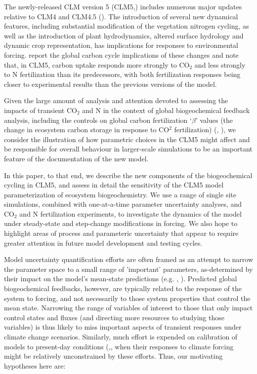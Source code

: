 \documentclass[draft,linenumbers]{agujournal}
\begin{document}
The newly-released CLM version 5  (CLM5,\cite{lawrence2018}) includes numerous major updates relative to CLM4 and CLM4.5 (\cite{lawrence2011}). The introduction of several new dynamical features, including substantial modification of the vegetation nitrogen cycling, as well as the introduction of plant hydrodynamics, altered surface hydrology and dynamic crop representation, has implications for responses to environmental forcing. \cite{wieder2019} report the global carbon cycle implications of these changes and note that, in CLM5, carbon uptake responds more strongly to CO$_{2}$ and less strongly to N fertilization than its predecessors, with both fertilization responses being closer to experimental results than the previous versions of the model. 

Given the large amount of analysis and attention devoted to assessing the impacts of transient CO$_{2}$ and N in the context of global biogeochemical feedback analysis, including the controls on global carbon fertilization `$\beta$' values (the change in ecosystem carbon storage in response to CO$^{2}$ fertilization) (\cite{arora2013}, \cite{friedlingstein2014}), we consider the illustration of how parametric choices in the CLM5 might affect and be responsible for overall behaviour in larger-scale simulations to be an important feature of the documentation of the new model.

In this paper, to that end, we describe the new components of the biogeochemical cycling in CLM5, and assess in detail the sensitivity of the CLM5 model parameterization of ecosystem biogeochemistry. We use a range of single site simulations, combined with one-at-a-time parameter uncertainty analyses, and CO$_{2}$ and N fertilization experiments, to investigate the dynamics of the model under steady-state and step-change modifications in forcing. We also hope to highlight areas of process and parameteric uncertainty that appear to require greater attention in future model development and testing cycles.

Model uncertainty quantification efforts are often framed as an attempt to narrow the parameter space to a small range of 'important' parameters, as-determined by their impact on the model's mean-state predictions (e.g. \cite{dietze2014}, \cite{ricciuto2018}).  Predicted global biogeochemical feedbacks, however, are typically related to the response of the system to forcing, and not necessarily to those system properties that control the mean state. Narrowing the range of variables of interest to those that only impact control states and fluxes (and directing more resources to studying those variables) is thus likely to miss important aspects of transient responses under climate change scenarios.  Similarly, much effort is expended on calibration of models to present-day conditions (\cite{fer2018},\cite{lu2018}, when their responses to climate forcing might be relatively unconstrained by these efforts.  Thus, our motivating hypotheses here are:
\end{document}
